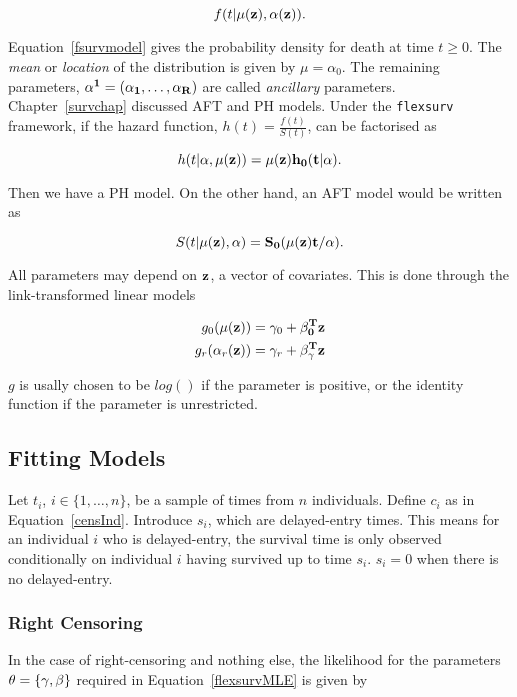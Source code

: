 \begin{equation}
    \label{fsurvmodel}
    f(t|\mu(\bf{z}), \bf{\alpha}(\bf{z})).
\end{equation}

Equation~\ref{fsurvmodel} gives the probability density for death at time $t \geq 0$. The \textit{mean} or \textit{location} of the distribution is given by $\mu = \alpha_0$. The remaining parameters, $\bf{\alpha^1} = (\alpha_1, \ldots, \alpha_R)$ are called \textit{ancillary} parameters. \\

Chapter~\ref{survchap} discussed AFT and PH models. Under the \verb|flexsurv| framework, if the hazard function, $h(t) = \frac{f(t)}{S(t)}$, can be factorised as 

\[
    h(t|\bf{\alpha}, \mu(\bf{z})) = \mu(\bf{z})h_0(t|\bf{\alpha}). 
\] 

Then we have a PH model. On the other hand, an AFT model would be written as

\[
    S(t|\mu(\bf{z}), \bf{\alpha}) = S_0(\mu(\bf{z})t/\bf{\alpha}).  
\]

All parameters may depend on $\bf{z}$, a vector of covariates. This is done through the link-transformed linear models

\begin{align}
    \label{flexsurvMLE}
    g_0(\mu(\bf{z})) &= \gamma_0 + \bf{\beta}_0^Tz \nonumber \\
    g_r(\alpha_r(\bf{z})) &= \gamma_r + \bf{\beta}_{\gamma}^T\bf{z}
\end{align}

$g$ is usally chosen to be $log()$ if the parameter is positive, or the identity function if the parameter is unrestricted.\\

\subsection{Fitting Models}
Let $t_i$, $i \in \{1, \ldots, n\}$, be a sample of times from $n$ individuals. Define $c_i$ as in Equation~\ref{censInd}. Introduce $s_i$, which are delayed-entry times. This means for an individual $i$ who is delayed-entry, the survival time is only observed conditionally on individual $i$ having survived up to time $s_i$. $s_i = 0$ when there is no delayed-entry. \\

\subsubsection{Right Censoring}
In the case of right-censoring and nothing else, the likelihood for the parameters $\bf{\theta} = \{\bf{\gamma}, \bf{\beta}\}$ required in Equation~\ref{flexsurvMLE} is given by 

